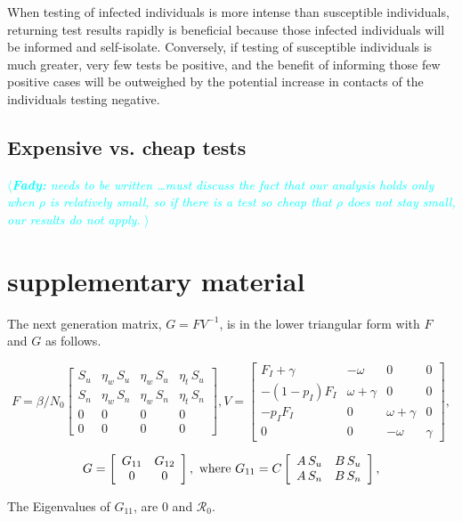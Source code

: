 \documentclass{article}
\newcommand{\fady}[1]{\textcolor{cyan}{$\langle${\slshape{\bfseries Fady:} #1 }$\rangle$}}
\newcommand{\Rnum}{\mathcal{R}_0}
\begin{document}
When testing of infected individuals is more intense than susceptible individuals, returning test results rapidly is beneficial because those infected individuals will be informed and self-isolate. Conversely, if testing of susceptible individuals is much greater, very few tests be positive, and the benefit of informing those few positive cases will be outweighed by the potential increase in contacts of the individuals testing negative. 

\subsection{Expensive vs. cheap tests}
\fady{needs to be written \dots must discuss the fact that our analysis holds only when $\rho$ is relatively small, so if there is a test so cheap that $\rho$ does not stay small, our results do not apply.}




\section{supplementary material}

The next generation matrix, $G = F V^{-1}$, is in the lower triangular form with $F$ and $G$ as follows.


\begin{equation}\label{FV}
F= \beta/N_0 \left[ \begin {array}{cccc} 
S_u&\eta_w\,S_u&\eta_w\,S_u&\eta_t\,S_u\\
S_n&\eta_w\,S_n&\eta_w\,S_n&\eta_t\,S_n\\ 
0&0&0&0\\
0&0&0&0
 \end {array} \right],
 V=
 \left[ \begin {array}{cccc}  
F_I+\gamma&-\omega&0&0\\
-(1-p_I)F_I&\omega+\gamma&0&0\\
-p_I F_I&0&\omega+\gamma&0\\
0&0&-\omega&\gamma
\end {array} \right],
\end{equation}

\begin{equation}
G = \left[ \begin {array}{cc}
G_{11}&G_{12}\\
0&0
\end {array} \right], \text{ where } \\
G_{11} =C
\left[\begin {array}{cc}
A\,S_u & B\,S_u\\
A\,S_n & B\,S_n
\end {array}\right],
\end{equation}

The Eigenvalues of $G_{11}$, are 0 and $\Rnum$.
\end{document}

